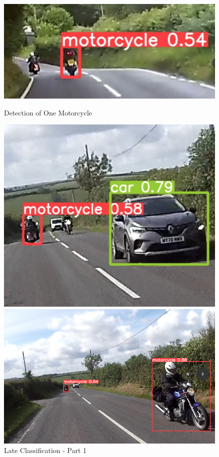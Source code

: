 \documentclass[conference]{IEEEtran}
\begin{document}
	\begin{figure}[h]
		\centering
		\begin{minipage}{0.15\textwidth}
			\centering
			\includegraphics[width=\linewidth]{Figures/fail.png}
			\caption{Detection of One Motorcycle}
			\label{fig:detectionOfOneMotorcycle}
		\end{minipage}\hfill
		\begin{minipage}{0.15\textwidth}
			\centering
			\includegraphics[width=\linewidth]{Figures/left_turn.png}
			\caption{Late Classification - Part 1}
			\label{fig:lateClassificationP1}
		\end{minipage}\hfill
		\begin{minipage}{0.15\textwidth}
			\centering
			\includegraphics[width=\linewidth]{Figures/motorcycle.png}

\end{minipage}
\end{figure}
\end{document}
